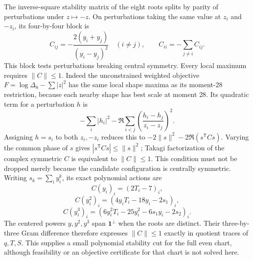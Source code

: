 \documentclass[11pt]{article}
\theoremstyle{remark}
\numberwithin{equation}{section}
\begin{document}
The inverse-square stability matrix of the eight roots splits by
parity of perturbations under $z\mapsto-z$. On perturbations taking
the same value at $z_i$ and $-z_i$, its four-by-four block is
\[
 C_{ij}=-\frac{2(y_i+y_j)}{(y_i-y_j)^2}\quad(i\ne j),
 \qquad C_{ii}=-\sum_{j\ne i}C_{ij}.
\]
This block tests perturbations breaking central symmetry. Every local
maximum requires $\|C\|\le1$. Indeed the unconstrained weighted
objective $F=\log\Delta_8-\sum|z|^2$ has the same local shape maxima
as its moment-$28$ restriction, because each nearby shape has best
scale at moment $28$. Its quadratic term for a perturbation $h$ is
\[
 -\sum_i|h_i|^2-\Re\sum_{i<j}
             \left(\frac{h_i-h_j}{z_i-z_j}\right)^2.
\]
Assigning $h=s_i$ to both $z_i,-z_i$ reduces this to
$-2\|s\|^2-2\Re(s^{\mathsf T}Cs)$. Varying the common phase of
$s$ gives $|s^{\mathsf T}Cs|\le\|s\|^2$; Takagi factorization of
the complex symmetric $C$ is equivalent to $\|C\|\le1$.
This condition must not be dropped merely because the candidate
configuration is centrally symmetric.
Writing $s_k=\sum_i y_i^k$, its exact polynomial actions are
\[
 C(y_i)_i=(2T_i-7)_i,
\]
\[
 C(y_i^2)_i=(4y_iT_i-18y_i-2s_1)_i,
\]
\[
 C(y_i^3)_i=(6y_i^2T_i-25y_i^2-6s_1y_i-2s_2)_i.
\]
The centered powers $y,y^2,y^3$ span $\mathbf1^\perp$ when the roots
are distinct. Their three-by-three Gram difference therefore expresses
$\|C\|\le1$ exactly in quotient traces of $q,T,S$. This supplies a
small polynomial stability cut for the full even chart, although
feasibility or an objective certificate for that chart is not solved
here.
\end{document}
